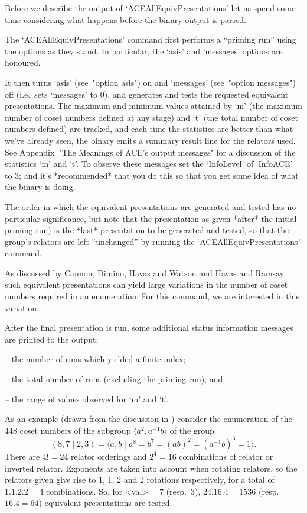 Before we describe the {\GAP} output of `ACEAllEquivPresentations' let
us spend some time considering what happens before the  {\ACE}  binary
output is parsed.

The `ACEAllEquivPresentations'  command  first  performs  a  ``priming
run'' using the options as they stand. In particular, the  `asis'  and
`messages' options are honoured.

It  then  turns  `asis'  (see~"option   asis")   on   and   `messages'
(see~"option messages") off (i.e.~sets `messages' to 0), and generates
and tests the requested  equivalent  presentations.  The  maximum  and
minimum values attained by `m' (the maximum number  of  coset  numbers
defined at any stage) and `t'  (the  total  number  of  coset  numbers
defined) are tracked, and each time the  statistics  are  better  than
what we've already seen, the {\ACE} binary emits a summary result line
for the relators used. See  Appendix~"The  Meanings  of  ACE's  output
messages" for a discussion of the statistics `m' and `t'.  To  observe
these messages set  the  `InfoLevel'  of  `InfoACE'  to  3;  and  it's
*recommended* that you do this so that you get some idea of  what  the
{\ACE} binary is doing.

The order in which the  equivalent  presentations  are  generated  and
tested has no particular significance, but note that the  presentation
as given *after* the initial priming run) is the  *last*  presentation
to be generated and tested, so that  the  group's  relators  are  left
``unchanged'' by running the `ACEAllEquivPresentations' command.

As discussed by Cannon, Dimino, Havas  and  Watson  \cite{CDHW73}  and
Havas and Ramsay \cite{HR01} such equivalent presentations  can  yield
large variations in  the  number  of  coset  numbers  required  in  an
enumeration. For this command, we are interested in this variation.

After  the  final  presentation  is  run,   some   additional   status
information messages are printed to the {\ACE} output:

\beginlist
\item{--}  the number of runs which yielded a finite index; 
\item{--}  the total number of runs (excluding the priming run); and 
\item{--}  the range of values observed for `m' and `t'.
\endlist

As an example (drawn from the discussion in \cite{HR99a}) consider the
enumeration   of   the   $448$   coset   numbers   of   the   subgroup
$\langle  a^2,a^{-1}b \rangle$ of the group
$$
(8,7 \mid 2,3) 
    = \langle a,b \mid a^8 = b^7 = (ab)^2 = (a^{-1}b)^3 = 1 \rangle.
$$
There are $4!=24$  relator  orderings  and  $2^4=16$  combinations  of
relator or inverted relator. Exponents are  taken  into  account  when
rotating relators, so the relators given give rise to 1, 1,  2  and  2
rotations respectively, for a total of $1.1.2.2=4$  combinations.  So,
for  <val>${} = 7$   (resp.~$3$),   $24.16.4=1536$   (resp.~$16.4=64$)
equivalent presentations are tested.

